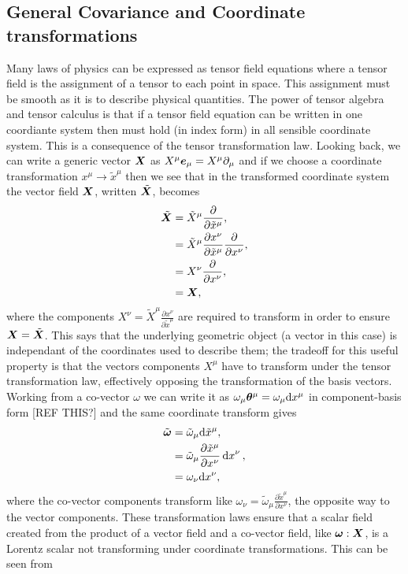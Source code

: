\subsection{General Covariance and Coordinate transformations}\label{intro:sec:cov}
Many laws of physics can be expressed as tensor field equations where a tensor field is the assignment of a tensor to each point in space. This assignment must be smooth as it is to describe physical quantities. The power of tensor algebra and tensor calculus is that if a tensor field equation can be written in one coordiante system then must hold (in index form) in all sensible coordinate system. This is a consequence of the tensor transformation law. Looking back, we can write a generic vector $\boldsymbol{X}$ as $X^\mu \boldsymbol{e}_\mu = X^\mu \partial_\mu$ and if we choose a coordinate transformation $x^\mu \rightarrow \tilde{x}^\mu$ then we see that in the transformed coordinate system the vector field $\boldsymbol{X}$, written $\tilde{\boldsymbol{X}}$, becomes
\begin{align}
\tilde{\boldsymbol X} &= \tilde{X}^\mu\frac{\partial}{\partial \tilde{x}^\mu}, \\
              &= \tilde{X}^\mu\frac{\partial x^\nu}{\partial \tilde{x}^\mu}\frac{\partial}{\partial {x}^\nu}, \\
              &= X^\nu \frac{\partial}{\partial x^\nu}, \\
              &= \boldsymbol{X}, \
\end{align}
where the components $X^\nu = \tilde{X}^\mu\frac{\partial x^\nu}{\partial \tilde{x}^\mu}$ are required to transform in order to ensure $\boldsymbol{X}=\tilde{\boldsymbol{X}}$. This says that the underlying geometric object (a vector in this case) is independant of the coordinates used to describe them; the tradeoff for this useful property is that the vectors components $X^\mu$ have to transform under the tensor transformation law, effectively opposing the transformation of the basis vectors. Working from a co-vector $\omega$ we can write it as $\omega_\mu \boldsymbol{\theta}^\mu = \omega_\mu \dd x^\mu$ in component-basis form [REF THIS?] and the same coordinate transform gives
\begin{align}
\tilde{\boldsymbol{\omega}} &= \tilde{\omega}_\mu \dd \tilde{x}^\mu , \\
                    &= \tilde{\omega}_\mu \frac{\partial \tilde{x}^\mu}{\partial x^\nu}\dd {x}^\nu , \\
                    &= \omega_\nu \dd x^\nu,
\end{align}
where the co-vector components transform like $\omega_\nu= \tilde{\omega}_\mu \frac{\partial \tilde{x}^\mu}{\partial x^\nu}$, the opposite way to the vector components. These transformation laws ensure that a scalar field created from the product of a vector field and a co-vector field, like $\boldsymbol{\omega}:\boldsymbol{X}$, is a Lorentz scalar not transforming under coordinate transformations. This can be seen from
